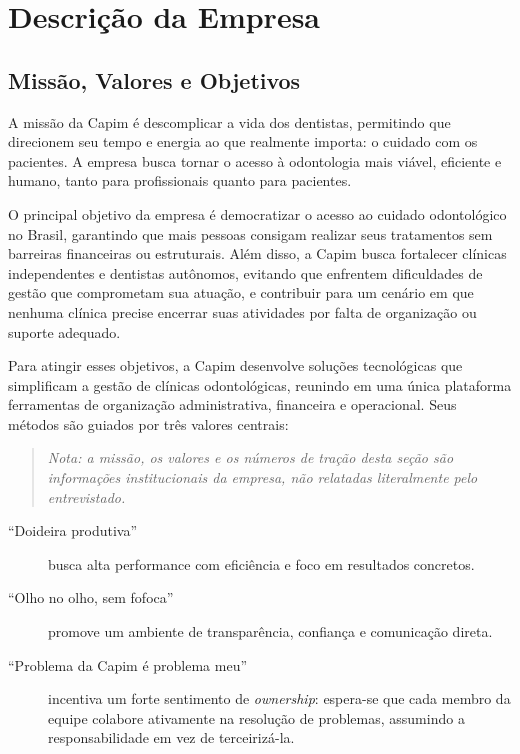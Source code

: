 
\chapter{Descrição da Empresa}
\label{cap:descricao-empresa}

\section{Missão, Valores e Objetivos}

A missão da Capim é descomplicar a vida dos dentistas, permitindo que direcionem seu tempo e energia ao que realmente importa: o cuidado com os pacientes. A empresa busca tornar o acesso à odontologia mais viável, eficiente e humano, tanto para profissionais quanto para pacientes.

O principal objetivo da empresa é democratizar o acesso ao cuidado odontológico no Brasil, garantindo que mais pessoas consigam realizar seus tratamentos sem barreiras financeiras ou estruturais. Além disso, a Capim busca fortalecer clínicas independentes e dentistas autônomos, evitando que enfrentem dificuldades de gestão que comprometam sua atuação, e contribuir para um cenário em que nenhuma clínica precise encerrar suas atividades por falta de organização ou suporte adequado.

Para atingir esses objetivos, a Capim desenvolve soluções tecnológicas que simplificam a gestão de clínicas odontológicas, reunindo em uma única plataforma ferramentas de organização administrativa, financeira e operacional. Seus métodos são guiados por três valores centrais:

\begin{quote}\footnotesize\itshape Nota: a missão, os valores e os números de tração desta seção são informações institucionais da empresa, não relatadas literalmente pelo entrevistado.\end{quote}

\begin{description}
  \item[``Doideira produtiva''] busca alta performance com eficiência e foco em resultados concretos.
  \item[``Olho no olho, sem fofoca''] promove um ambiente de transparência, confiança e comunicação direta.
  \item[``Problema da Capim é problema meu''] incentiva um forte sentimento de \textit{ownership}: espera-se que cada membro da equipe colabore ativamente na resolução de problemas, assumindo a responsabilidade em vez de terceirizá-la.
\end{description}

